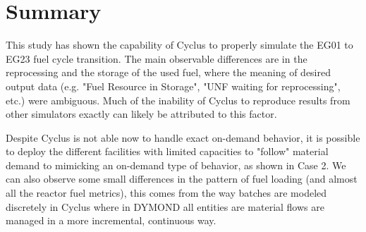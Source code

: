 \documentclass[12pt]{article}
\begin{document}
\section{Summary}

This study has shown the capability of Cyclus to properly simulate the EG01 to
EG23 fuel cycle transition.  The main observable differences are in the
reprocessing and the storage of the used fuel, where the meaning of desired
output data (e.g. "Fuel Resource in Storage", "UNF waiting for reprocessing",
etc.) were ambiguous.  Much of the inability of Cyclus to reproduce results
from other simulators exactly can likely be attributed to this factor.

Despite Cyclus is not able now to handle exact on-demand behavior, it is
possible to deploy the different facilities with limited capacities to
"follow" material demand to mimicking an on-demand type of behavior, as shown
in Case 2.  We can also observe some small differences in the pattern of fuel
loading (and almost all the reactor fuel metrics), this comes from the way
batches are modeled discretely in Cyclus where in DYMOND all entities are
material flows are managed in a more incremental, continuous way.






\end{document}
